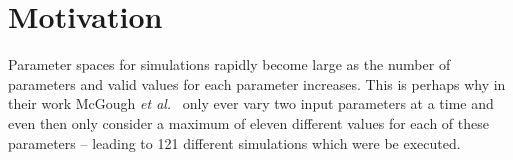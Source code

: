 \documentclass[10pt, conference, compsocconf]{IEEEtran}
\begin{document}

	

\section{Motivation}
\label{motivation}

Parameter spaces for simulations rapidly become large as the number of parameters and valid values for each parameter increases. This is perhaps why in their work McGough \textit{et al.}~\cite{suscom} only ever vary two input parameters at a time and even then only consider a maximum of eleven different values for each of these parameters -- leading to 121 different simulations which were be executed. 
\end{document}
